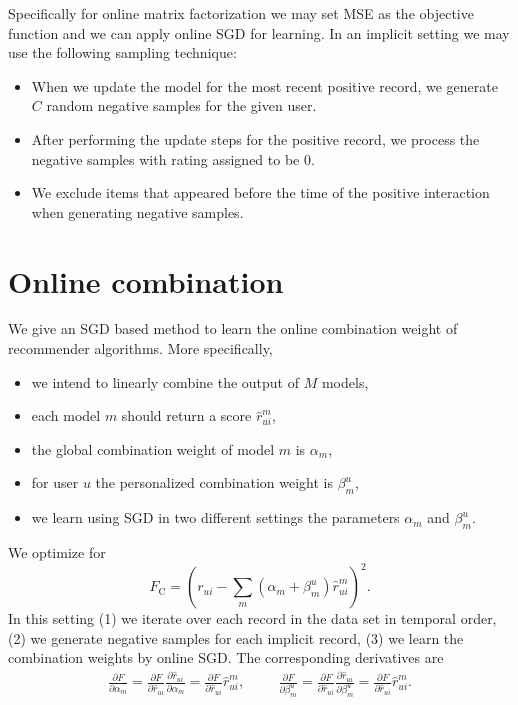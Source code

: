 \documentclass[10pt]{article}
\newenvironment{myitemize}{\begin{itemize} \setlength{\topsep}{0pt} \setlength{\itemsep}{0pt} \setlength{\parskip}{0pt} \setlength{\parsep}{0pt}}{  \end{itemize} }
\begin{document}
Specifically for online matrix factorization we may set MSE as the objective function and we can apply online SGD for learning.
In an implicit setting we may use the following sampling technique:
\begin{myitemize}
\item When we update the model for the most recent positive record, we generate $C$ random negative samples for the given user.
\item After performing the update steps for the positive record, we process the negative samples with rating assigned to be 0.
\item We exclude items that appeared before the time of the positive interaction when generating negative samples.
\end{myitemize}

\section{Online combination}
\label{sec:online-combination}

We give an SGD based method to learn the online combination weight of recommender algorithms.
More specifically,
\begin{myitemize}
	\item we intend to linearly combine the output of $M$ models,
	\item each model $m$ should return a score $\hat{r}_{ui}^m$,
	\item the global combination weight of model $m$ is $\alpha_m$,
	\item for user $u$ the personalized combination weight is $\beta_m^u$,
	\item we learn using SGD in two different settings the parameters $\alpha_m$ and $\beta_m^u$.
\end{myitemize}
We optimize for
\begin{equation}
F_{\text{C}}= \left ( r_{ui} - \displaystyle\sum_m (\alpha_m + \beta_m^u) \hat{r}^m_{ui}\right )^2.
\end{equation}
In this setting (1) we iterate over each record in the data set in temporal order, (2) we generate negative samples for each implicit record, (3) we learn the combination weights by online SGD. The corresponding derivatives are
\begin{gather}
\frac{\partial F}{\partial \alpha_m} = \frac{\partial F}{\partial \hat{r}_{ui}} \frac{\partial \hat{r}_{ui}}{\partial \alpha_m} = \frac{\partial F}{\partial \hat{r}_{ui}} \hat{r}_{ui}^m, \hspace{1cm}
  \frac{\partial F}{\partial \beta_m^u} = \frac{\partial F}{\partial \hat{r}_{ui}} \frac{\partial \hat{r}_{ui}}{\partial \beta_m^u} = \frac{\partial F}{\partial \hat{r}_{ui}} \hat{r}_{ui}^m.
\end{gather}
\end{document}
